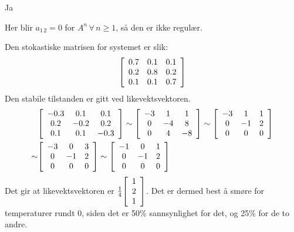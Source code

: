 \documentclass[11pt, a4paper, norsk]{NTNUoving}
\newenvironment{pkt}{\begin{punkt}}{\end{punkt}}
\newenvironment{matrise}[1][c]
{
\left[\begin{array}{#1}
}
{    
\end{array}\right]           
}
\begin{document}
\begin{oppgave}
    \begin{pkt}
    Ja
    \end{pkt}
    \begin{pkt}
        Her blir $a_{1\,2}=0$ for $A^n\,\forall\, n\geq 1$, så den er ikke regulær.
    \end{pkt}
\end{oppgave}

\begin{oppgave}
    Den stokastiske matrisen for systemet er slik: 
    \begin{align*}
        \begin{matrise}[ccc]
            0.7 & 0.1 & 0.1\\
            0.2 & 0.8 & 0.2 \\
            0.1 & 0.1 & 0.7
        \end{matrise}
    \end{align*}
    Den stabile tilstanden er gitt ved likevektsvektoren.
    \begin{align*}
        &\begin{matrise}[ccc]
            -0.3 & 0.1 & 0.1\\
            0.2 & -0.2 & 0.2 \\
            0.1 & 0.1 & -0.3
        \end{matrise} \sim \begin{matrise}[ccc]
            -3 & 1 & 1\\
            0 & -4 & 8 \\
            0 & 4 & -8
        \end{matrise} \sim \begin{matrise}[ccc]
            -3 & 1 & 1\\
            0 & -1 & 2 \\
            0 & 0 & 0
        \end{matrise}\\ \sim& \begin{matrise}[ccc]
            -3 & 0 & 3\\
            0 & -1 & 2 \\
            0 & 0 & 0
        \end{matrise} \sim \begin{matrise}[ccc]
            -1 & 0 & 1\\
            0 & -1 & 2 \\
            0 & 0 & 0
        \end{matrise}
    \end{align*}
    Det gir at likevektsvektoren er $\frac{1}{4}\begin{matrise}
    1\\2\\1
    \end{matrise}$. Det er dermed best å smøre for temperaturer rundt 0, siden det er 50\% sannsynlighet for det, og 25\% for de to andre.
\end{oppgave}
\end{document}

